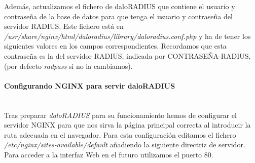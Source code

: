 
Además, actualizamos el fichero de daloRADIUS que contiene el usuario y contraseña de la base de datos para que tenga el usuario y contraseña del servidor RADIUS. Este fichero está en \emph{/usr/share/nginx/html/daloradius/library/daloradius.conf.php} y ha de tener los siguientes valores en los campos correspondientes. Recordamos que esta contraseña es la del servidor RADIUS, indicada por CONTRASEÑA-RADIUS, (por defecto \emph{radpass} si no la cambiamos).


\paragraph{Configurando NGINX para servir daloRADIUS} \label{NGINXdaloRADIUS} ~\\

Tras preparar \emph{daloRADIUS} para su funcionamiento hemos de configurar el servidor NGINX para que nos sirva la página principal correcta al introducir la ruta adecuada en el navegador. Para esta configuración editamos el fichero \emph{/etc/nginx/sites-available/default} añadiendo la siguiente directriz de servidor. Para acceder a la interfaz Web en el futuro utilizamos el puerto 80.

